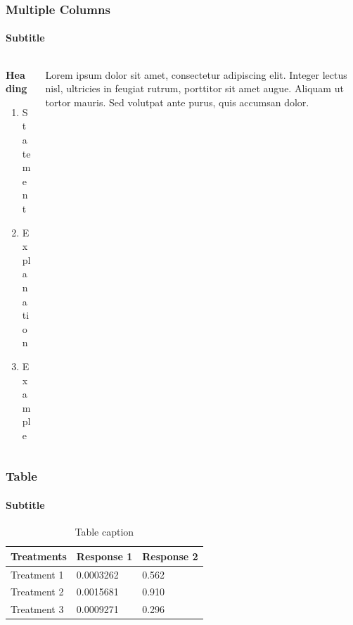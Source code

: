 \documentclass[
	11pt, %
]{beamer}
\begin{document}


\begin{frame}
    \frametitle{Multiple Columns}
    \framesubtitle{Subtitle} %

    \begin{columns}[c] %
        \begin{column}{0.45\textwidth} %
            \textbf{Heading}
            \begin{enumerate}
                \item Statement
                \item Explanation
                \item Example
            \end{enumerate}
        \end{column}
        \begin{column}{0.5\textwidth} %
            Lorem ipsum dolor sit amet, consectetur adipiscing elit. Integer lectus nisl, ultricies in feugiat rutrum, porttitor sit amet augue. Aliquam ut tortor mauris. Sed volutpat ante purus, quis accumsan dolor.
        \end{column}
    \end{columns}
\end{frame}




\begin{frame}
    \frametitle{Table}
    \framesubtitle{Subtitle} %

    \begin{table}
        \begin{tabular}{l l l}
            \toprule
            \textbf{Treatments} & \textbf{Response 1} & \textbf{Response 2} \\
            \midrule
            Treatment 1         & 0.0003262           & 0.562               \\
            Treatment 2         & 0.0015681           & 0.910               \\
            Treatment 3         & 0.0009271           & 0.296               \\
            \bottomrule
        \end{tabular}
        \caption{Table caption}
    \end{table}
\end{frame}
\end{document}
